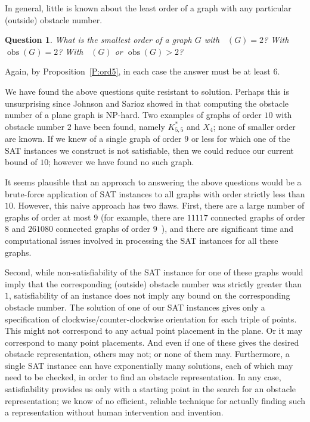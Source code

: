 \documentclass[12pt]{amsart}
\newtheorem{question}[theorem]{Question}
\theoremstyle{remark}
\DeclareMathOperator{\obs}{\ensuremath{\mathrm{obs}}}
\DeclareMathOperator{\obsout}{\ensuremath{\obs_\mathrm{out}}}
\begin{document}
In general,
little is known about the least order
of a graph with any particular
(outside) obstacle number.

\begin{question} What is the smallest order
of a
graph $G$ with $\obsout(G) = 2$?
With $\obs(G) = 2$?
With $\obsout(G)$ or $\obs(G) > 2$?\end{question}

Again, by Proposition~\ref{P:ord5},
in each case the answer
must be at least $6$.

We have found the above questions quite
resistant to solution. Perhaps this is unsurprising since Johnson and Sarioz showed in \cite{JohSar11} that computing the obstacle number of a plane graph is NP-hard.
Two examples of graphs of order $10$
with obstacle number $2$ have been found,
namely $K_{5,5}^{*}$ and $X_{4}$;
none of smaller order
are known.
If we knew of a single graph of order $9$ or less
for which one of the SAT instances we construct
is not satisfiable,
then we could reduce our current bound of $10$;
however we have found no such graph.

It seems plausible that an approach to answering
the above questions
would be a brute-force application of SAT instances
to all graphs with order strictly less than $10$.
However, this naive approach has two flaws.
First,
there are a large number of graphs of
order at most $9$
(for example, there are $11117$ connected graphs of order $8$
and $261080$ connected graphs of order $9$~\cite[Sequence~A001349]{OEIS}),
and there are significant time and computational issues
involved in processing
the SAT instances for all these graphs.

Second,
while non-satisfiability of the SAT instance
for one of these graphs would imply
that the corresponding (outside) obstacle number
was strictly greater than $1$,
satisfiability of
an instance
does not imply any bound on
the corresponding obstacle number.
The solution of one of our SAT instances
gives only a specification of clockwise/counter-clockwise
orientation
for each triple of points.
This might not correspond to any actual point placement in the plane.
Or it may correspond to many point placements.
And even if one of these gives the desired obstacle representation,
others may not;
or none of them may.
Furthermore, a single SAT instance
can have exponentially many solutions,
each of which may need to be checked,
in order to find an obstacle representation.
In any case,
satisfiability provides us
only with a starting point in
the search for an obstacle representation;
we know of no efficient, reliable technique
for actually finding such a representation without human intervention
and invention.



\end{document}
